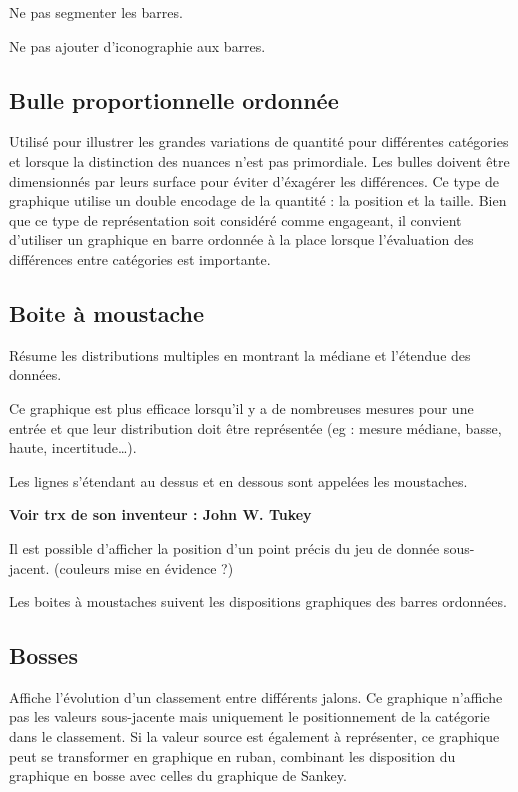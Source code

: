 \documentclass[a4paper,12pt]{article}
\begin{document}
\begin{multicols}{2}
Ne pas segmenter les barres. \autocite{jonathanschwabishComparingCategories2021}

Ne pas ajouter d'iconographie aux barres. \autocite{tranDiscoveringAccessibleData2024}
\subsection*{Bulle proportionnelle ordonnée}
\label{sec:org0741fb2}
Utilisé pour illustrer les grandes variations de quantité pour différentes catégories et lorsque la distinction des nuances n'est pas primordiale. Les bulles doivent être dimensionnés par leurs surface pour éviter d'éxagérer les différences. \autocite{jonathanschwabishComparingCategories2021} Ce type de graphique utilise un double encodage de la quantité : la position et la taille. \autocite{wilkeVisualizingAssociationsTwo2019} Bien que ce type de représentation soit considéré comme engageant, il convient d'utiliser un graphique en barre ordonnée à la place lorsque l'évaluation des différences entre catégories est importante. \autocite{jonathanschwabishComparingCategories2021}
\subsection*{Boite à moustache}
\label{sec:orgb60681f}
Résume les distributions multiples en montrant la médiane et l'étendue des données. \autocite{alansmithLexiqueVisuel}

Ce graphique est plus efficace lorsqu'il y a de nombreuses mesures pour une entrée et que leur distribution doit être représentée (eg : mesure médiane, basse, haute, incertitude\ldots{}). \autocite{mikeyiHowChooseRight2020}

Les lignes s'étendant au dessus et en dessous sont appelées les moustaches. \autocite{wilkeVisualizingManyDistributions2019}

\textbf{Voir trx de son inventeur : John W. Tukey}

Il est possible d'afficher la position d'un point précis du jeu de donnée sous-jacent. (couleurs mise en évidence ?)

Les boites à moustaches suivent les dispositions graphiques des barres ordonnées. \autocite{stephenfewComponentlevelGraphDesign2012}
\subsection*{Bosses}
\label{sec:orgbd23bf7}
Affiche l'évolution d'un classement entre différents jalons. \autocite{mikeyiHowChooseRight2020,alansmithLexiqueVisuel}  Ce graphique n'affiche pas les valeurs sous-jacente mais uniquement le positionnement de la catégorie dans le classement. \autocite{jonathanschwabishTime2021} Si la valeur source est également à représenter, ce graphique peut se transformer en graphique en ruban, combinant les disposition du graphique en bosse avec celles du graphique de Sankey. \autocite{jonathanschwabishTime2021}

\end{multicols}
\end{document}
